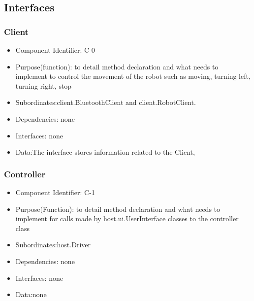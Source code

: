 \documentclass[11pt, a4paper]{report}
\begin{document}
\subsection{Interfaces}
\subsubsection{Client}
\begin{itemize}
\item Component Identifier: C-0
\item Purpose(function): to detail method declaration and what needs to implement 
to control the movement of the robot such as moving, turning left, turning right, stop
\item Subordinates:client.BluetoothClient and client.RobotClient.
\item Dependencies: none
\item Interfaces: none
\item Data:The interface stores information related to the Client, %
\end{itemize}

\subsubsection{Controller}
\begin{itemize}
\item Component Identifier: C-1
\item Purpose(Function): to detail method declaration and what needs to implement
for calls made by host.ui.UserInterface classes to the controller class
\item Subordinates:host.Driver
\item Dependencies: none
\item Interfaces: none
\item Data:none
\end{itemize}
\end{document}
